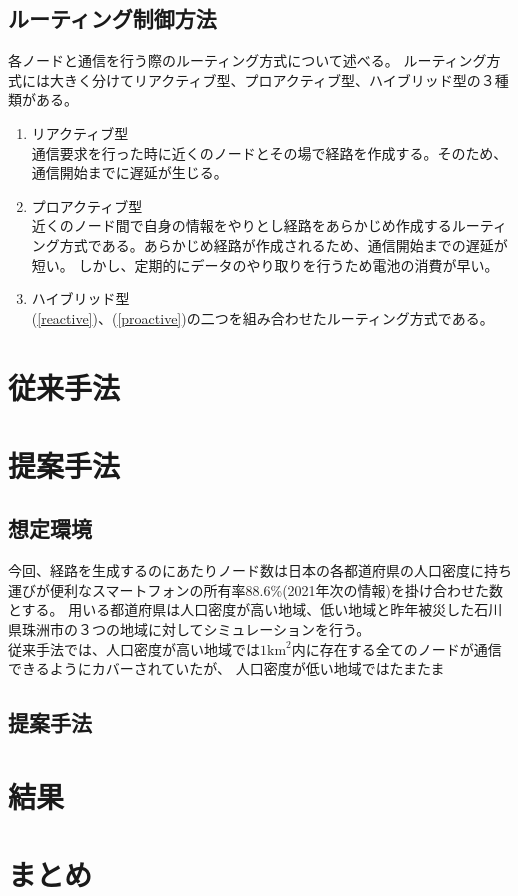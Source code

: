 \documentclass[a4paper, 10pt]{ltjsarticle}
\begin{document}
\subsection{ルーティング制御方法}
各ノードと通信を行う際のルーティング方式について述べる。
ルーティング方式には大きく分けてリアクティブ型、プロアクティブ型、ハイブリッド型の３種類がある。
\begin{enumerate}
  \item \label{reactive} リアクティブ型\\通信要求を行った時に近くのノードとその場で経路を作成する。そのため、通信開始までに遅延が生じる。
  \item \label{proactive} プロアクティブ型\\近くのノード間で自身の情報をやりとし経路をあらかじめ作成するルーティング方式である。あらかじめ経路が作成されるため、通信開始までの遅延が短い。
  しかし、定期的にデータのやり取りを行うため電池の消費が早い。
  \item ハイブリッド型\\(\ref{reactive})、(\ref{proactive})の二つを組み合わせたルーティング方式である。
\end{enumerate}
\section{従来手法}
\section{提案手法}
\subsection{想定環境}
今回、経路を生成するのにあたりノード数は日本の各都道府県の人口密度に持ち運びが便利なスマートフォンの所有率88.6\%(2021年次の情報)を掛け合わせた数とする。%
用いる都道府県は人口密度が高い地域、低い地域と昨年被災した石川県珠洲市の３つの地域に対してシミュレーションを行う。
\\従来手法では、人口密度が高い地域では$1\mathrm{km}^2$内に存在する全てのノードが通信できるようにカバーされていたが、
人口密度が低い地域ではたまたま
\subsection{提案手法}
\section{結果}

\section{まとめ}
\end{document}
